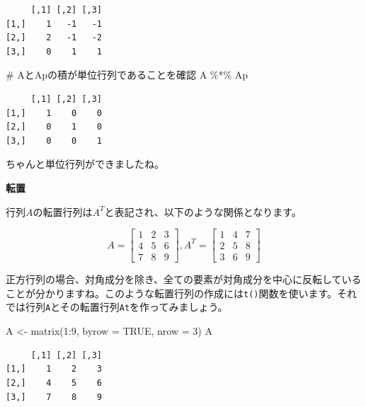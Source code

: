 \documentclass[
  a4paper,
  pandoc,
  ja=standard,
  jafont=haranoaji]{bxjsbook}
\newenvironment{Shaded}{\begin{snugshade}}{\end{snugshade}}
\newcommand{\AttributeTok}[1]{\textcolor[rgb]{0.00,0.48,0.65}{#1}}
\newcommand{\CommentTok}[1]{\textcolor[rgb]{0.37,0.37,0.37}{#1}}
\newcommand{\ConstantTok}[1]{\textcolor[rgb]{0.56,0.35,0.01}{#1}}
\newcommand{\DecValTok}[1]{\textcolor[rgb]{0.68,0.00,0.00}{#1}}
\newcommand{\FunctionTok}[1]{\textcolor[rgb]{0.28,0.35,0.67}{#1}}
\newcommand{\NormalTok}[1]{\textcolor[rgb]{0.00,0.48,0.65}{#1}}
\newcommand{\OtherTok}[1]{\textcolor[rgb]{0.00,0.48,0.65}{#1}}
\newcommand{\SpecialCharTok}[1]{\textcolor[rgb]{0.37,0.37,0.37}{#1}}
\begin{document}
\begin{verbatim}
     [,1] [,2] [,3]
[1,]    1   -1   -1
[2,]    2   -1   -2
[3,]    0    1    1
\end{verbatim}

\begin{Shaded}
\begin{Highlighting}[numbers=left,,]
\CommentTok{\# AとApの積が単位行列であることを確認}
\NormalTok{A }\SpecialCharTok{\%*\%}\NormalTok{ Ap}
\end{Highlighting}
\end{Shaded}

\begin{verbatim}
     [,1] [,2] [,3]
[1,]    1    0    0
[2,]    0    1    0
[3,]    0    0    1
\end{verbatim}

ちゃんと単位行列ができましたね。

\textbf{転置}

行列\(A\)の転置行列は\(A^T\)と表記され、以下のような関係となります。

\[
A = \left[
\begin{matrix} 
1 & 2 & 3 \\ 
4 & 5 & 6 \\
7 & 8 & 9
\end{matrix}
\right],
A^T = \left[
\begin{matrix} 
1 & 4 & 7 \\ 
2 & 5 & 8 \\
3 & 6 & 9
\end{matrix}
\right]
\]

正方行列の場合、対角成分を除き、全ての要素が対角成分を中心に反転していることが分かりますね。このような転置行列の作成には\texttt{t()}関数を使います。それでは行列\texttt{A}とその転置行列\texttt{At}を作ってみましょう。

\begin{Shaded}
\begin{Highlighting}[numbers=left,,]
\NormalTok{A  }\OtherTok{\textless{}{-}} \FunctionTok{matrix}\NormalTok{(}\DecValTok{1}\SpecialCharTok{:}\DecValTok{9}\NormalTok{, }\AttributeTok{byrow =} \ConstantTok{TRUE}\NormalTok{, }\AttributeTok{nrow =} \DecValTok{3}\NormalTok{)}
\NormalTok{A}
\end{Highlighting}
\end{Shaded}

\begin{verbatim}
     [,1] [,2] [,3]
[1,]    1    2    3
[2,]    4    5    6
[3,]    7    8    9
\end{verbatim}
\end{document}
